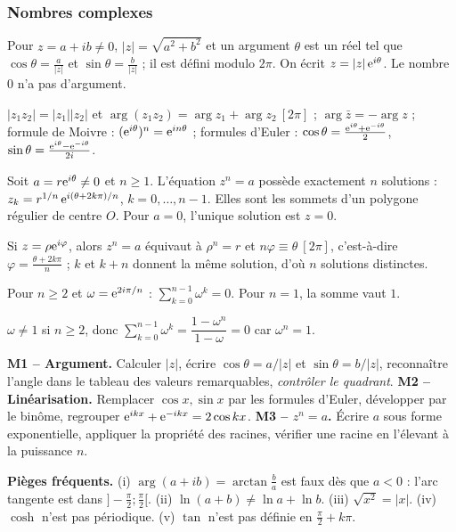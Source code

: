 \subsubsection*{Nombres complexes}
\begin{definition}
Pour $z=a+ib\neq0$, $|z|=\sqrt{a^2+b^2}$ et un argument $\theta$ est un réel tel que $\cos\theta=\frac a{|z|}$ et $\sin\theta=\frac b{|z|}$ ; il est défini modulo $2\pi$. On écrit $z=|z|\,\mathrm{e}^{i\theta}$. Le nombre $0$ n'a pas d'argument.
\end{definition}
\begin{propriete}
$|z_1z_2|=|z_1||z_2|$ et $\arg(z_1z_2)=\arg z_1+\arg z_2\ [2\pi]$ ; $\arg\bar z=-\arg z$ ; formule de Moivre : $(\mathrm{e}^{i\theta})^n=\mathrm{e}^{in\theta}$ ; formules d'Euler : $\cos\theta=\frac{\mathrm{e}^{i\theta}+\mathrm{e}^{-i\theta}}2$, $\sin\theta=\frac{\mathrm{e}^{i\theta}-\mathrm{e}^{-i\theta}}{2i}$.
\end{propriete}
\begin{propriete}
Soit $a=r\mathrm{e}^{i\theta}\ne0$ et $n\ge1$. L'équation $z^n=a$ possède exactement $n$ solutions : $z_k=r^{1/n}\,\mathrm{e}^{i(\theta+2k\pi)/n}$, $k=0,\dots,n-1$. Elles sont les sommets d'un polygone régulier de centre $O$. Pour $a=0$, l'unique solution est $z=0$.
\end{propriete}
\begin{demonstration}
Si $z=\rho\mathrm{e}^{i\varphi}$, alors $z^n=a$ équivaut à $\rho^n=r$ et $n\varphi\equiv\theta\ [2\pi]$, c'est-à-dire $\varphi=\frac{\theta+2k\pi}n$ ; $k$ et $k+n$ donnent la même solution, d'où $n$ solutions distinctes.
\end{demonstration}
\begin{propriete}
Pour $n\ge2$ et $\omega=\mathrm{e}^{2i\pi/n}$ : $\sum_{k=0}^{n-1}\omega^k=0$. Pour $n=1$, la somme vaut $1$.
\end{propriete}
\begin{demonstration}
$\omega\ne1$ si $n\ge2$, donc $\sum_{k=0}^{n-1}\omega^k=\dfrac{1-\omega^n}{1-\omega}=0$ car $\omega^n=1$.
\end{demonstration}
\begin{methode}
\textbf{M1 -- Argument.} Calculer $|z|$, écrire $\cos\theta=a/|z|$ et $\sin\theta=b/|z|$, reconnaître l'angle dans le tableau des valeurs remarquables, \emph{contrôler le quadrant}. \textbf{M2 -- Linéarisation.} Remplacer $\cos x,\sin x$ par les formules d'Euler, développer par le binôme, regrouper $\mathrm{e}^{ikx}+\mathrm{e}^{-ikx}=2\cos kx$. \textbf{M3 -- $z^n=a$.} Écrire $a$ sous forme exponentielle, appliquer la propriété des racines, vérifier une racine en l'élevant à la puissance $n$.
\end{methode}
\begin{piege}
\textbf{Pièges fréquents.} (i) $\arg(a+ib)=\arctan\frac ba$ est faux dès que $a<0$ : l'arc tangente est dans $]-\frac\pi2;\frac\pi2[$. (ii) $\ln(a+b)\ne\ln a+\ln b$. (iii) $\sqrt{x^2}=|x|$. (iv) $\cosh$ n'est pas périodique. (v) $\tan$ n'est pas définie en $\frac\pi2+k\pi$.
\end{piege}

